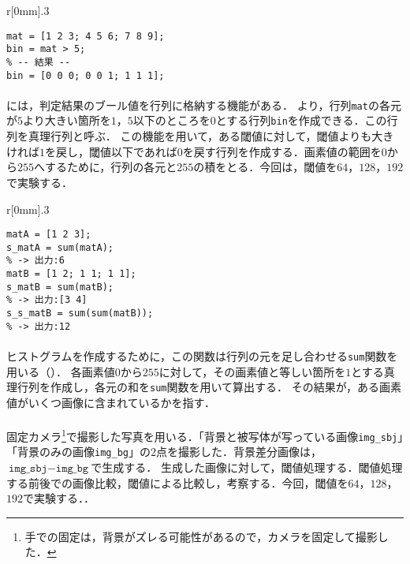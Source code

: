 \begin{wrapfigure}{r}[0mm]{.3\textwidth}
    \centering
    \vspace{-.7cm}
    \begin{lstlisting}[caption={判定結果の格納},label={src:判定結果の格納}]
mat = [1 2 3; 4 5 6; 7 8 9];
bin = mat > 5;
% -- 結果 --
bin = [0 0 0; 0 0 1; 1 1 1];     
    \end{lstlisting}
    \vspace{-.5cm}
\end{wrapfigure}
\paragraph{\kadaiad}
\matlab には，判定結果のブール値を行列に格納する機能がある．
より，行列\texttt{mat}の各元が\(5\)より大きい箇所を\(1\)，\(5\)以下のところを\(0\)とする行列\texttt{bin}を作成できる．この行列を真理行列と呼ぶ．
この機能を用いて，ある閾値に対して，閾値よりも大きければ\(1\)を戻し，閾値以下であれば\(0\)を戻す行列を作成する．画素値の範囲を\(0\)から\(255\)へするために，行列の各元と\(255\)の積をとる．今回は，閾値を\(64\)，\(128\)，\(192\)で実験する．\scall{\kadaiad}

\begin{wrapfigure}{r}[0mm]{.3\textwidth}
    \centering
    \vspace{-.9cm}
    \begin{lstlisting}[caption={\texttt{sum}関数},label={src:sum関数}]
matA = [1 2 3];
s_matA = sum(matA); 
% -> 出力:6
matB = [1 2; 1 1; 1 1];
s_matB = sum(matB); 
% -> 出力:[3 4]
s_s_matB = sum(sum(matB)); 
% -> 出力:12
    \end{lstlisting}
    \vspace{-.7cm}
\end{wrapfigure}
\paragraph{\kadaiae}
ヒストグラムを作成するために，この関数は行列の元を足し合わせる\texttt{sum}関数を用いる（）．
各画素値\(0\)から\(255\)に対して，その画素値と等しい箇所を\(1\)とする真理行列を作成し，各元の和を\texttt{sum}関数を用いて算出する．
その結果が，ある画素値がいくつ画像に含まれているかを指す．
\paragraph{\kadaiaf}
固定カメラ\footnote{手での固定は，背景がズレる可能性があるので，カメラを固定して撮影した．}で撮影した写真を用いる．「背景と被写体が写っている画像\texttt{img\_sbj}」「背景のみの画像\texttt{img\_bg}」の2点を撮影した．背景差分画像は，\(\texttt{img\_sbj}-\texttt{img\_bg}\)で生成する．
生成した画像に対して，閾値処理する．閾値処理する前後での画像比較，閾値による比較し，考察する．今回，閾値を\(64\)，\(128\)，\(192\)で実験する．\scall{\kadaiaf}．